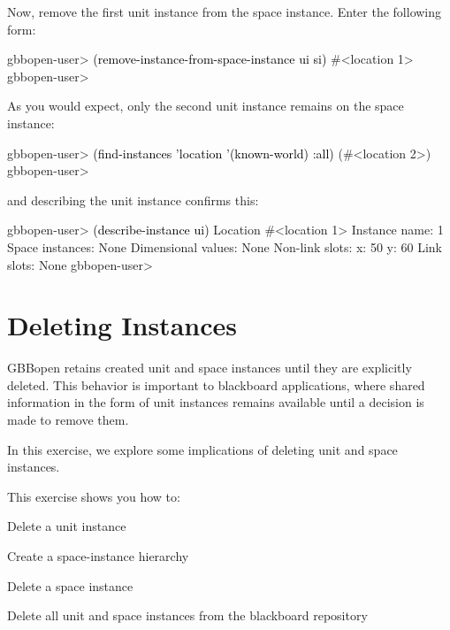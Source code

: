 \documentclass[10pt,twoside,english,pdftex]{article}
\begin{document}
%
%
Now, remove the first  unit instance from the
 space instance.  Enter the following form:
%
\W\supp
\begin{example}
\textcolor{darkergray}{%
  gbbopen-user> \textcolor{black}{(remove-instance-from-space-instance ui si)}
  #<location 1>
  gbbopen-user>}
\end{example}
%
%
As you would expect, only the second  unit instance remains on the
 space instance:
%
\W\supp\notpretop
\begin{example}
\textcolor{darkergray}{%
  gbbopen-user> \textcolor{black}{(find-instances 'location '(known-world) :all)}
  (#<location 2>)
  gbbopen-user>}
\end{example}
%
and describing the  unit instance confirms this:
%
\W\supp\notpretop
\begin{example}
\textcolor{darkergray}{%
  gbbopen-user> \textcolor{black}{(describe-instance ui)}
  Location #<location 1>
    Instance name: 1
    Space instances: None
    Dimensional values: None
    Non-link slots:
      x:  50
      y:  60
    Link slots: None
  gbbopen-user>}
\end{example}


\T\markright{}%
\T\pagestyle{plain}
\T\cleardoublepage
\W{}
\T\pagestyle{fancy}
\T\thispagestyle{fancybottom}
\T\renewcommand{\headrulewidth}{0pt}
\section{Deleting Instances}
\label{sec:deleting-instance}%

GBBopen retains created unit and space instances until they are explicitly
deleted.  This behavior is important to blackboard applications, where shared
information in the form of unit instances remains available until a decision
is made to remove them.

In this exercise, we explore some implications of deleting unit and space
instances.

\fndocrule

This exercise shows you how to:
\begin{tightitemize}
\item Delete a unit instance
\item Create a space-instance hierarchy
\item Delete a space instance
\item Delete all unit and space instances from the blackboard repository
\end{tightitemize}
\end{document}
